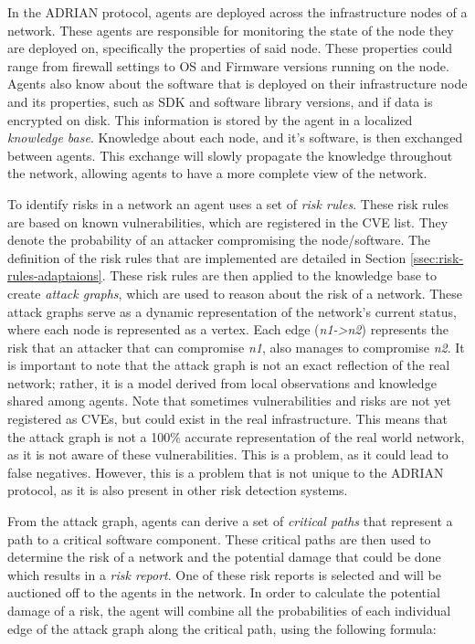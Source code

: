 In the ADRIAN protocol, agents are deployed across the infrastructure nodes of a network. These agents are responsible for monitoring the state of the node they are deployed on, specifically the properties of said node. These properties could range from firewall settings to OS and Firmware versions running on the node. Agents also know about the software that is deployed on their infrastructure node and its properties, such as SDK and software library versions, and if data is encrypted on disk. This information is stored by the agent in a localized \emph{knowledge base}. Knowledge about each node, and it's software, is then exchanged between agents. This exchange will slowly propagate the knowledge throughout the network, allowing agents to have a more complete view of the network.

\vspace{0.5em}
To identify risks in a network an agent uses a set of \emph{risk rules}. These risk rules are based on known vulnerabilities, which are registered in the CVE list. They denote the probability of an attacker compromising the node/software. The definition of the risk rules that are implemented are detailed in Section \ref{ssec:risk-rules-adaptaions}.
These risk rules are then applied to the knowledge base to create \emph{attack graphs}, which are used to reason about the risk of a network. These attack graphs serve as a dynamic representation of the network's current status, where each node is represented as a vertex. Each edge (\emph{n1->n2}) represents the risk that an attacker that can compromise \emph{n1}, also manages to compromise \emph{n2}. It is important to note that the attack graph is not an exact reflection of the real network; rather, it is a model derived from local observations and knowledge shared among agents. 
Note that sometimes vulnerabilities and risks are not yet registered as CVEs, but could exist in the real infrastructure. This means that the attack graph is not a 100\% accurate representation of the real world network, as it is not aware of these vulnerabilities. This is a problem, as it could lead to false negatives. However, this is a problem that is not unique to the ADRIAN protocol, as it is also present in other risk detection systems.

From the attack graph, agents can derive a set of \emph{critical paths} that represent a path to a critical software component. These critical paths are then used to determine the risk of a network and the potential damage that could be done which results in a \emph{risk report}. One of these risk reports is selected and will be auctioned off to the agents in the network. In order to calculate the potential damage of a risk, the agent will combine all the probabilities of each individual edge of the attack graph along the critical path, using the following formula:

